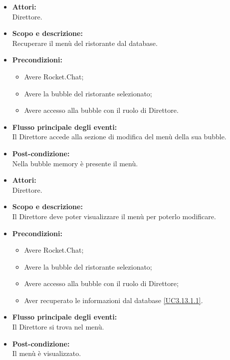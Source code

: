 \begin{itemize}
	\item \textbf{Attori:}
	\\Direttore.
	\item \textbf{Scopo e descrizione:} 
	\\Recuperare il menù del ristorante dal database.
	\item \textbf{Precondizioni:}
	\begin{itemize}
		\item Avere Rocket.Chat;
		\item Avere la bubble del ristorante selezionato;
		\item Avere accesso alla bubble con il ruolo di Direttore.
	\end{itemize}
	\item \textbf{Flusso principale degli eventi:}
	\\Il Direttore accede alla sezione di modifica del menù della sua bubble.
	\item \textbf{Post-condizione:}
	\\Nella bubble memory è presente il menù.
\end{itemize}


\begin{itemize}
	\item \textbf{Attori:}
	\\Direttore.
	\item \textbf{Scopo e descrizione:} 
	\\Il Direttore deve poter visualizzare il menù per poterlo modificare.
	\item \textbf{Precondizioni:}
	\begin{itemize}
		\item Avere Rocket.Chat;
		\item Avere la bubble del ristorante selezionato;
		\item Avere accesso alla bubble con il ruolo di Direttore;
		\item Aver recuperato le informazioni dal database \ref{UC3.13.1.1}.
	\end{itemize}
	\item \textbf{Flusso principale degli eventi:}
	\\Il Direttore si trova nel menù.
	\item \textbf{Post-condizione:}
	\\Il menù è visualizzato.
\end{itemize}

